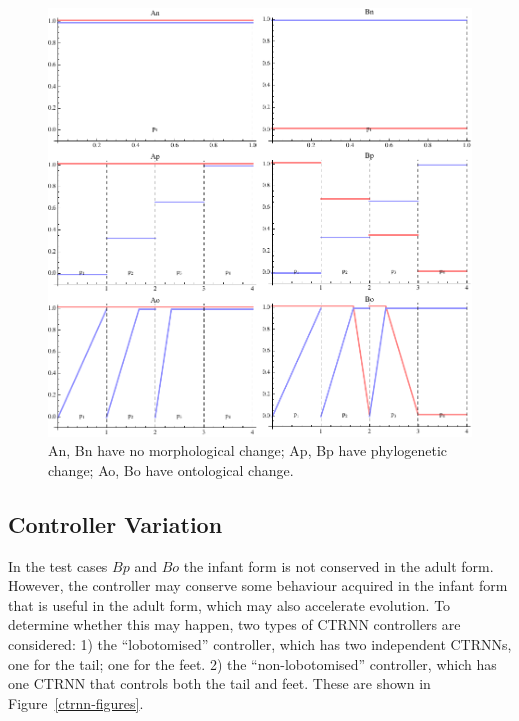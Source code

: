 \begin{figure}
  \centering
  \includegraphics[scale=1.0]{fig/morph-regiment.pdf} 
  \vspace{-15pt}
  \caption[Variations of morphological
    change]{\label{morph-regiment}An, Bn have no morphological change;
    Ap, Bp have phylogenetic change; Ao, Bo have ontological change.}

\end{figure}

\subsection{Controller Variation}

In the test cases $Bp$ and $Bo$ the infant form is not conserved in
the adult form.  However, the controller may conserve some behaviour
acquired in the infant form that is useful in the adult form, which
may also accelerate evolution.  To determine whether this may happen,
two types of CTRNN controllers are considered: 1) the ``lobotomised''
controller, which has two independent CTRNNs, one for the tail; one
for the feet. 2) the ``non-lobotomised'' controller, which has one
CTRNN that controls both the tail and feet.  These are shown in
Figure~\ref{ctrnn-figures}.

